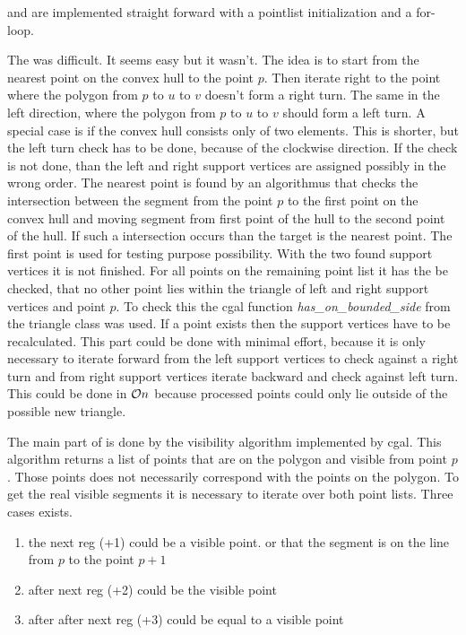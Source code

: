  and  are implemented straight forward with a
pointlist initialization and a for-loop.

The  was difficult. It seems easy but it wasn't. The idea
is to start from the nearest point on the convex hull to the point $p$.
Then iterate right to the point where the polygon from $p$ to $u$ to $v$
doesn't form a right turn. The same in the left direction, where the
polygon from $p$ to $u$ to $v$ should form a left turn. A special case is if the
convex hull consists only of two elements. This is shorter, but the
left turn check has to be done, because of the clockwise direction. If
the check is not done, than the left and right support vertices are
assigned possibly in the wrong order. The nearest point is found by an
algorithmus that checks the intersection between the segment from the
point $p$ to the first point on the convex hull and moving segment from
first point of the hull to the second point of the hull. If such a
intersection occurs than the target is the nearest point. The first
point is used for testing purpose possibility. With the two found
support vertices it is not finished. For all points on the remaining
point list it has the be checked, that no other point lies within the
triangle of left and right support vertices and point $p$. To check this
the cgal function \textit{has\_on\_bounded\_side} from the triangle
class was used. If a point exists then the support
vertices have to be recalculated. This part could be done with minimal
effort, because it is only necessary to iterate forward from the left
support vertices to check against a right turn and from right support
vertices iterate backward and check against left turn. This could be
done in $\mathcal{O}{n}$ because processed points could only lie outside of
the possible new triangle.

The main part of  is done by the visibility algorithm
implemented by cgal. This algorithm returns a list of points that are
on the polygon and visible from point $p$. Those points does not
necessarily correspond with the points on the polygon. To get the real
visible segments it is necessary to iterate over both point lists.
Three cases exists.

\begin{enumerate}
  \item the next reg (+1) could be a visible point. or
    that the segment is on the line from $p$ to the point $p+1$
  \item after next reg (+2) could be the visible point
  \item after after next reg (+3) could be equal to a visible point
\end{enumerate}

